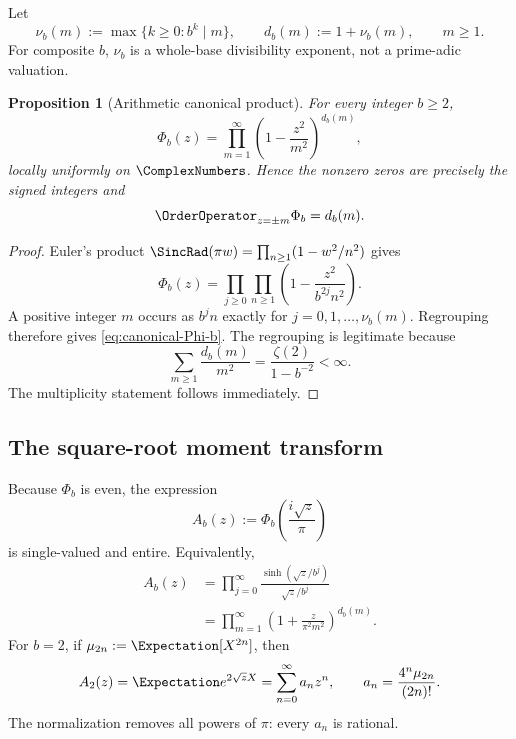 \documentclass[11pt]{article}
\newtheorem{proposition}[theorem]{Proposition}
\theoremstyle{definition}
\theoremstyle{remark}
\begin{document}
Let
\begin{equation}\label{eq:db}
  \nu_b(m):=\max\{k\ge0:b^k\mid m\},
  \qquad d_b(m):=1+\nu_b(m),\qquad m\ge1.
\end{equation}
For composite \(b\), \(\nu_b\) is a whole-base divisibility exponent, not a prime-adic valuation.

\begin{proposition}[Arithmetic canonical product]\label{prop:canonical}
For every integer \(b\ge2\),
\begin{equation}\label{eq:canonical-Phi-b}
  \Phi_b(z)=\prod_{m=1}^{\infty}
  \left(1-\frac{z^2}{m^2}\right)^{d_b(m)},
\end{equation}
locally uniformly on \(\ComplexNumbers\).  Hence the nonzero zeros are precisely the signed integers and
\begin{equation}\label{eq:order-db}
  \OrderOperator_{z=\pm m}\Phi_b=d_b(m).
\end{equation}
\end{proposition}

\begin{proof}
Euler's product
\(
\SincRad(\pi w)=\prod_{n\ge1}(1-w^2/n^2)
\)
gives
\[
  \Phi_b(z)=\prod_{j\ge0}\prod_{n\ge1}
  \left(1-\frac{z^2}{b^{2j}n^2}\right).
\]
A positive integer \(m\) occurs as \(b^jn\) exactly for
\(j=0,1,\ldots,\nu_b(m)\).  Regrouping therefore gives \eqref{eq:canonical-Phi-b}.  The regrouping is legitimate because
\[
 \sum_{m\ge1}\frac{d_b(m)}{m^2}
 =\frac{\zeta(2)}{1-b^{-2}}<\infty.
\]
The multiplicity statement follows immediately.
\end{proof}

\subsection{The square-root moment transform}

Because \(\Phi_b\) is even, the expression
\begin{equation}\label{eq:A-b}
  A_b(z):=\Phi_b\!\left(\frac{i\sqrt z}{\pi}\right)
\end{equation}
is single-valued and entire.  Equivalently,
\begin{align}
  A_b(z)
  &=\prod_{j=0}^{\infty}
    \frac{\sinh(\sqrt z/b^j)}{\sqrt z/b^j}
    \label{eq:A-scale-product}\\
  &=\prod_{m=1}^{\infty}
    \left(1+\frac{z}{\pi^2m^2}\right)^{d_b(m)}.
    \label{eq:A-spectral-product}
\end{align}
For \(b=2\), if \(\mu_{2n}:=\Expectation[X^{2n}]\), then
\begin{equation}\label{eq:a-moment}
  A_2(z)=\Expectation e^{2\sqrt z X}
  =\sum_{n=0}^{\infty}a_nz^n,
  \qquad a_n=\frac{4^n\mu_{2n}}{(2n)!}.
\end{equation}
The normalization removes all powers of \(\pi\): every \(a_n\) is rational.
\end{document}
